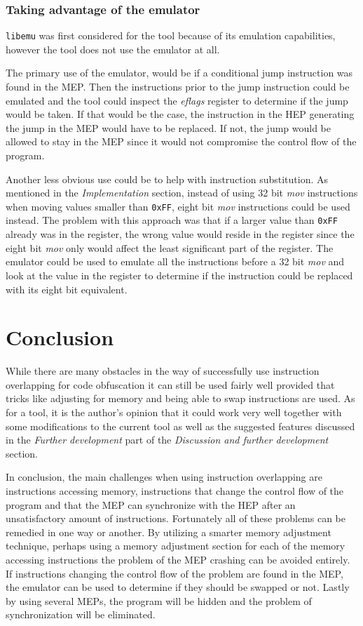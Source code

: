 \documentclass[11pt,twoside]{eitExjobb}
\begin{document}
\subsection{Taking advantage of the emulator}
\texttt{libemu} was first considered for the tool because of its emulation capabilities, however the tool does not use the emulator at all. 

The primary use of the emulator, would be if a conditional jump instruction was found in the MEP. Then the instructions prior to the jump instruction could be emulated and the tool could inspect the \emph{eflags} register to determine if the jump would be taken. If that would be the case, the instruction in the HEP generating the jump in the MEP would have to be replaced. If not, the jump would be allowed to stay in the MEP since it would not compromise the control flow of the program.

Another less obvious use could be to help with instruction substitution. As mentioned in the \emph{Implementation} section, instead of using 32 bit \emph{mov} instructions when moving values smaller than \texttt{0xFF}, eight bit \emph{mov} instructions could be used instead. The problem with this approach was that if a larger value than \texttt{0xFF} already was in the register, the wrong value would reside in the register since the eight bit \emph{mov} only would affect the least significant part of the register. The emulator could be used to emulate all the instructions before a 32 bit \emph{mov} and look at the value in the register to determine if the instruction could be replaced with its eight bit equivalent.

\chapter{Conclusion}
While there are many obstacles in the way of successfully use instruction overlapping for code obfuscation it can still be used fairly well provided that tricks like adjusting for memory and being able to swap instructions are used. As for a tool, it is the author's opinion that it could work very well together with some modifications to the current tool as well as the suggested features discussed in the \emph{Further development} part of the \emph{Discussion and further development} section.

In conclusion, the main challenges when using instruction overlapping are instructions accessing memory, instructions that change the control flow of the program and that the MEP can synchronize with the HEP after an unsatisfactory amount of instructions. Fortunately all of these problems can be remedied in one way or another. By utilizing a smarter memory adjustment technique, perhaps using a memory adjustment section for each of the memory accessing instructions the problem of the MEP crashing can be avoided entirely. If instructions changing the control flow of the problem are found in the MEP, the emulator can be used to determine if they should be swapped or not. Lastly by using several MEPs, the program will be hidden and the problem of synchronization will be eliminated. 
\end{document}
